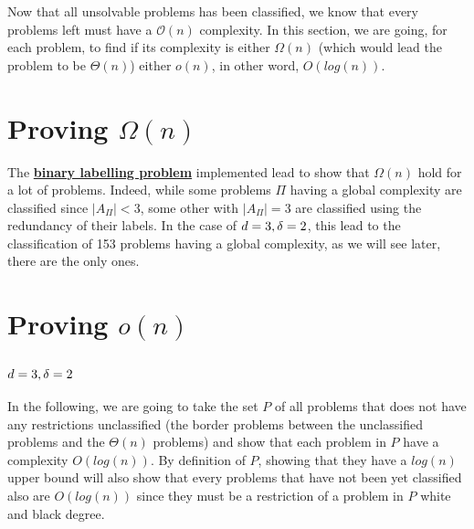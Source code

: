 Now that all unsolvable problems has been classified, we know that every problems left must have a $\mathcal{O}(n)$ complexity. In this section, we are going, for each problem, to find if its complexity is either $\Omega(n)$ (which would lead the problem to be $\Theta(n)$) either $o(n)$, in other word, $O(log(n))$.
\section[Proving Omega(n)]{Proving $\Omega(n)$}
The \hyperref[sec:BLP]{\textbf{binary labelling problem}} implemented lead to show that $\Omega(n)$ hold for a lot of problems. Indeed, while some problems $\Pi$ having a global complexity are classified since $|A_\Pi|<3$, some other with $|A_\Pi| = 3$ are classified using the redundancy of their labels. In the case of $d = 3, \delta = 2$, this lead to the classification of 153 problems having a global complexity, as we will see later, there are the only ones.
\section[Proving o(n)]{Proving $o(n)$}
\subsection[For degree tupple (3,2)]{$d = 3, \delta = 2$}
In the following, we are going to take the set $P$ of all problems that does not have any restrictions unclassified (the border problems between the unclassified problems and the $\Theta(n)$ problems) and show that each problem in $P$ have a complexity $O(log(n))$. By definition of $P$, showing that they have a $log(n)$ upper bound will also show that every problems that have not been yet classified also are $O(log(n))$ since they must be a restriction of a problem in $P$ white and black degree.

